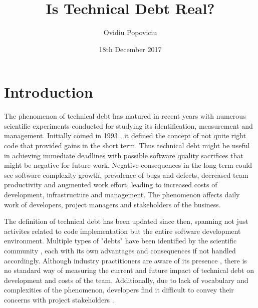 \documentclass{mprop}
\begin{document}
\title{Is Technical Debt Real?}
\author{Ovidiu Popoviciu}
\date{18th December 2017}
\maketitle

\tableofcontents
\newpage

\section{Introduction}
\label{intro}

The phenomenon of technical debt has matured in recent years with numerous
scientific experiments conducted for studying its identification, measurement
and management. Initially coined in 1993 \cite{Cunningham1993}, it defined the
concept of not quite right code that provided gains in the short term. Thus
technical debt might be useful in achieving immediate deadlines with possible
software quality sacrifices that might be negative for future work. Negative
consequences in the long term could see software complexity growth, prevalence
of bugs and defects, decreased team productivity and augmented work effort,
leading to increased costs of development, infrastructure and management. The
phenomenon affects daily work of developers, project managers and stakeholders
of the business. 

The definition of technical debt has been updated since then, spanning not just
activites related to code implementation but the entire software development
environment. Multiple types of "debts" have been identified by the scientific
community \cite{Li2015}, each with its own advantages and consequences if not
handled accordingly. Although industry practitioners are aware of its presence
\cite{Codabux2013} \cite{Lim2012}, there is no standard way of measuring the
current and future impact of technical debt on development and costs of the
team. Additionally, due to lack of vocabulary and complexities of the
phenomenon, developers find it difficult to convey their concerns with project
stakeholders \cite{Kruchten2012}.
\end{document}
